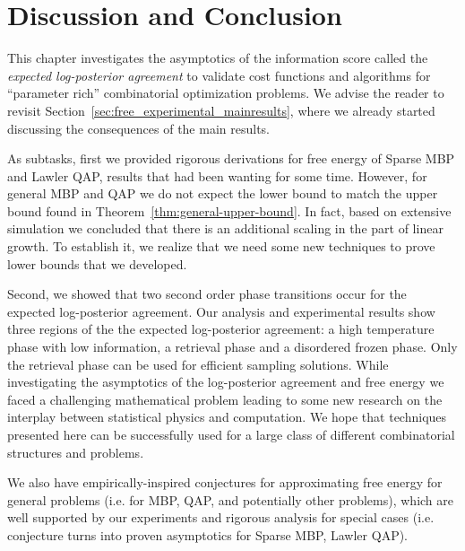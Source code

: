 
%


\section{Discussion and Conclusion}
\label{sec:free_free_energy:conclusion}

This chapter investigates the asymptotics of the information score called the
\emph{expected log-posterior agreement} to validate cost functions and
algorithms for ``parameter rich'' combinatorial optimization problems. We advise the
reader to revisit Section~\ref{sec:free_experimental_mainresults}, where we 
already started discussing the consequences of the main results.

As subtasks, first we provided rigorous derivations for free energy of Sparse
MBP and Lawler QAP, results that had been wanting for some time. However, for
general MBP and QAP we do not expect the lower bound to match the upper bound
found in Theorem~\ref{thm:general-upper-bound}. In fact, based on extensive
simulation we concluded that there is an additional scaling in the part of
linear growth. To establish it, we realize that we need some new techniques to
prove lower bounds that we developed.

Second, we showed that two second order phase transitions
occur for the expected log-posterior agreement. Our analysis and experimental
results show three regions of the the expected log-posterior agreement: a high
temperature phase with low information, a retrieval phase and a disordered
frozen phase. Only the retrieval phase can be used for efficient sampling
solutions. While investigating the asymptotics of the log-posterior agreement
and free energy we faced a challenging mathematical problem leading to some new
research on the interplay between statistical physics and computation. We hope
that techniques presented here can be successfully used for a large class of
different combinatorial structures and problems.

We also have empirically-inspired conjectures for approximating free
energy for general problems (i.e. for MBP, QAP, and potentially other problems),
which are well supported by our experiments and rigorous analysis for special
cases (i.e. conjecture turns into proven asymptotics for Sparse MBP, Lawler
QAP).

